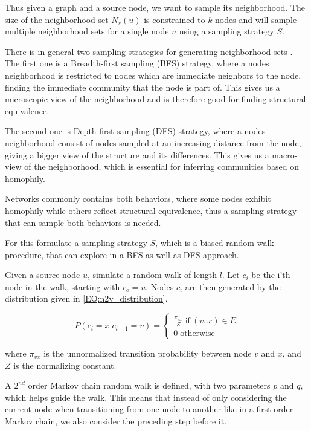 Thus given a graph and a source node, we want to sample its neighborhood. The size of the neighborhood set $N_s(u)$ is constrained to $k$ nodes and will sample multiple neighborhood sets for a single node $u$ using a sampling strategy $S$.

There is in general two sampling-strategies for generating neighborhood sets \cite{Node2vec}. The first one is a Breadth-first sampling (BFS) strategy, where a nodes neighborhood is restricted to nodes which are immediate neighbors to the node, finding the immediate community that the node is part of. This gives us a microscopic view of the neighborhood and is therefore good for finding structural equivalence.

The second one is Depth-first sampling (DFS) strategy, where a nodes neighborhood consist of nodes sampled at an increasing distance from the node, giving a bigger view of the structure and its differences. This gives us a macro-view of the neighborhood, which is essential for inferring communities based on homophily.

Networks commonly contains both behaviors, where some nodes exhibit homophily while others reflect structural equivalence, thus a sampling strategy that can sample both behaviors is needed.

For this \cite{Node2vec} formulate a sampling strategy $S$, which is a biased random walk procedure, that can explore in a BFS as well as DFS approach.

Given a source node $u$, simulate a random walk of length $l$. Let $c_i$ be the i'th node in the walk, starting with $c_o = u$. Nodes $c_i$ are then generated by the distribution given in \autoref{EQ:n2v_distribution}.

\begin{equation}\label{EQ:n2v_distribution}
P(c_i = x | c_{i-1} = v) = 
\begin{cases} 
	\frac{\pi_{vx}}{Z}  \; \text{if} \: (v,x) \in E \\
	0 \; \text{otherwise}
\end{cases}
\end{equation}

where $\pi_{vx}$ is the unnormalized transition probability between node $v$ and $x$, and $Z$ is the normalizing constant.

A $2^{nd}$ order Markov chain random walk is defined, with two parameters $p$ and $q$, which helps guide the walk. This means that instead of only considering the current node when transitioning from one node to another like in a first order Markov chain, we also consider the preceding step before it.

